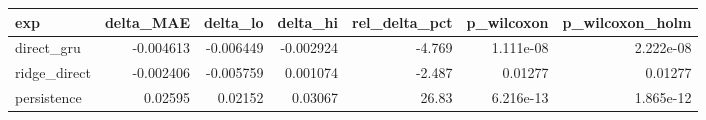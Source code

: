 \begin{tabular}{lrrrrrr}
\toprule
exp & delta\_MAE & delta\_lo & delta\_hi & rel\_delta\_pct & p\_wilcoxon & p\_wilcoxon\_holm \\
\midrule
direct\_gru & -0.004613 & -0.006449 & -0.002924 & -4.769 & 1.111e-08 & 2.222e-08 \\
ridge\_direct & -0.002406 & -0.005759 & 0.001074 & -2.487 & 0.01277 & 0.01277 \\
persistence & 0.02595 & 0.02152 & 0.03067 & 26.83 & 6.216e-13 & 1.865e-12 \\
\bottomrule
\end{tabular}
